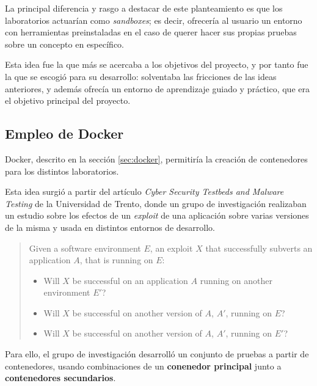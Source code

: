             La principal diferencia y rasgo a destacar de este planteamiento es que los laboratorios actuarían como \textit{sandboxes}; es decir, ofrecería al usuario un entorno con herramientas preinstaladas en el caso de querer hacer sus propias pruebas sobre un concepto en específico.

            Esta idea fue la que más se acercaba a los objetivos del proyecto, y por tanto fue la que se escogió para su desarrollo: solventaba las fricciones de las ideas anteriores, y además ofrecía un entorno de aprendizaje guiado y práctico, que era el objetivo principal del proyecto.

        \subsection{Empleo de Docker}

            Docker, descrito en la sección \ref{sec:docker}, permitiría la creación de contenedores para los distintos laboratorios.
                
            Esta idea surgió a partir del artículo \textit{Cyber Security Testbeds and Malware Testing} \cite{securitylab-malware-analysis} de la Universidad de Trento, donde un grupo de investigación realizaban un estudio sobre los efectos de un \textit{exploit} de una aplicación sobre varias versiones de la misma y usada en distintos entornos de desarrollo.

            \begin{quotation}
                
                Given a software environment $E$, an exploit $X$ that successfully subverts an application $A$, that is running on $E$:
                
                \begin{itemize}
                    \item Will $X$ be successful on an application $A$ running on another environment $E'$?
                    \item Will $X$ be successful on another version of $A$, $A'$, running on $E$?
                    \item Will $X$ be successful on another version of $A$, $A'$, running on $E'$?
                \end{itemize}

            \end{quotation}

            Para ello, el grupo de investigación desarrolló un conjunto de pruebas a partir de contenedores, usando combinaciones de un \textbf{conenedor principal} junto a \textbf{contenedores secundarios}.

